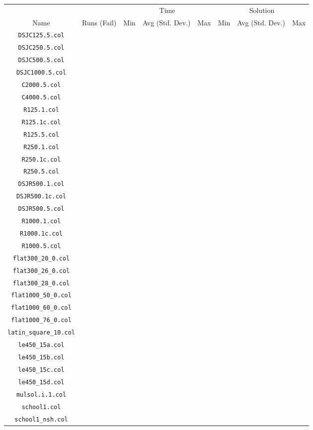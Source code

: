 %
%
\begin{tabular}[htbp]{c|c|ccc|ccc}
  &    &\multicolumn{3}{c|}{Time}&\multicolumn{3}{c}{Solution}\\
Name       &Runs (Fail)&Min&Avg (Std. Dev.)&Max&Min&Avg (Std. Dev.)&Max\\\hline
{\tt DSJC125.5.col}& & & & & & & \\
{\tt DSJC250.5.col}& & & & & & & \\
{\tt DSJC500.5.col}& & & & & & & \\
{\tt DSJC1000.5.col}& & & & & & & \\
{\tt C2000.5.col}& & & & & & & \\
{\tt C4000.5.col}& & & & & & & \\
{\tt R125.1.col}& & & & & & & \\
{\tt R125.1c.col}& & & & & & & \\
{\tt R125.5.col}& & & & & & & \\
{\tt R250.1.col}& & & & & & & \\
{\tt R250.1c.col}& & & & & & & \\
{\tt R250.5.col}& & & & & & & \\
{\tt DSJR500.1.col}& & & & & & & \\
{\tt DSJR500.1c.col}& & & & & & & \\
{\tt DSJR500.5.col}& & & & & & & \\
{\tt R1000.1.col}& & & & & & & \\
{\tt R1000.1c.col}& & & & & & & \\
{\tt R1000.5.col}& & & & & & & \\
{\tt flat300\_20\_0.col}& & & & & & & \\
{\tt flat300\_26\_0.col}& & & & & & & \\
{\tt flat300\_28\_0.col}& & & & & & & \\
{\tt flat1000\_50\_0.col}& & & & & & & \\
{\tt flat1000\_60\_0.col}& & & & & & & \\
{\tt flat1000\_76\_0.col}& & & & & & & \\
{\tt latin\_square\_10.col}& & & & & & & \\
{\tt le450\_15a.col}& & & & & & & \\
{\tt le450\_15b.col}& & & & & & & \\
{\tt le450\_15c.col}& & & & & & & \\
{\tt le450\_15d.col}& & & & & & & \\
{\tt mulsol.i.1.col}& & & & & & & \\
{\tt school1.col}& & & & & & & \\
{\tt school1\_nsh.col}& & & & & & & \\
\end{tabular}



